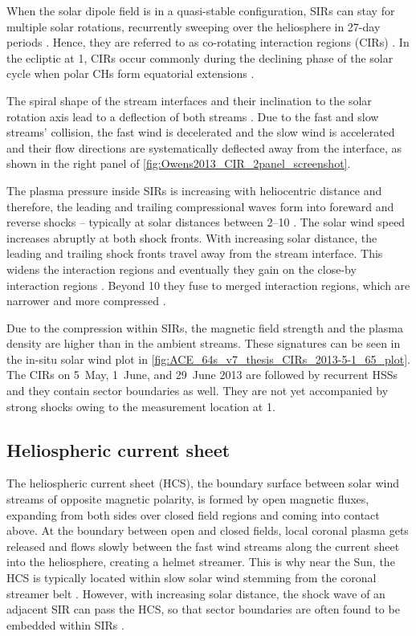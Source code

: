 When the solar dipole field is in a quasi-stable configuration, SIRs can stay for multiple solar rotations, recurrently sweeping over the heliosphere in 27-day periods \citep{Gosling1972}. Hence, they are referred to as co-rotating interaction regions (CIRs) \citep{Smith1976,Balogh1999}.
In the ecliptic at \SI{1}{\au}, CIRs occur commonly during the declining phase of the solar cycle when polar CHs form equatorial extensions \citep{Balogh2009}.

The spiral shape of the stream interfaces and their inclination to the solar rotation axis lead to a deflection of both streams \citep{Balogh2009}. Due to the fast and slow streams' collision, the fast wind is decelerated and the slow wind is accelerated and their flow directions are systematically deflected away from the interface, as shown in the right panel of \autoref{fig:Owens2013_CIR_2panel_screenshot}.

The plasma pressure inside SIRs is increasing with heliocentric distance and therefore, the leading and trailing compressional waves form into foreward and reverse shocks -- typically at solar distances between \SIrange{2}{10}{\au} \citep{Smith1976,Balogh2009}. The solar wind speed increases abruptly at both shock fronts.
With increasing solar distance, the leading and trailing shock fronts travel away from the stream interface. This widens the interaction regions and eventually they gain on the close-by interaction regions \citep{Burlaga1984}. Beyond \SI{10}{\au} they fuse to merged interaction regions, which are narrower and more compressed \citep{Burlaga1985}.

Due to the compression within SIRs, the magnetic field strength and the plasma density are higher than in the ambient streams. These signatures can be seen in the in-situ solar wind plot in \autoref{fig:ACE_64s_v7_thesis_CIRs_2013-5-1_65_plot}. The CIRs on 5~May, 1~June, and 29~June 2013 are followed by recurrent HSSs and they contain sector boundaries as well. They are not yet accompanied by strong shocks owing to the measurement location at \SI{1}{\au}.


\subsection{Heliospheric current sheet}
The heliospheric current sheet (HCS), the boundary surface between solar wind streams of opposite magnetic polarity, is formed by open magnetic fluxes, expanding from both sides over closed field regions and coming into contact above. At the boundary between open and closed fields, local coronal plasma gets released and flows slowly between the fast wind streams along the current sheet into the heliosphere, creating a helmet streamer. This is why near the Sun, the HCS is typically located within slow solar wind stemming from the coronal streamer belt \citep{Owens2013}. However, with increasing solar distance, the shock wave of an adjacent SIR can pass the HCS, so that sector boundaries are often found to be embedded within SIRs \citep{Gosling1999}.


